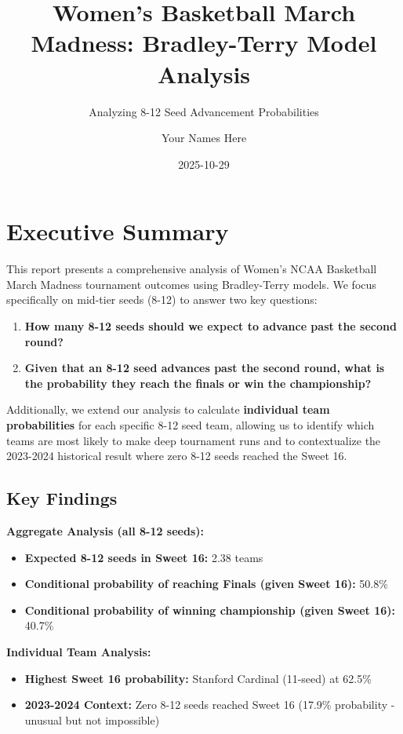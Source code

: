 \documentclass[
]{article}
\title{Women's Basketball March Madness: Bradley-Terry Model Analysis}
\subtitle{Analyzing 8-12 Seed Advancement Probabilities}
\author{Your Names Here}
\date{2025-10-29}
\providecommand{\tightlist}{%
  \setlength{\itemsep}{0pt}\setlength{\parskip}{0pt}}
\begin{document}
\maketitle

{
\setcounter{tocdepth}{3}
\tableofcontents
}
\section{Executive Summary}\label{executive-summary}

This report presents a comprehensive analysis of Women's NCAA Basketball
March Madness tournament outcomes using Bradley-Terry models. We focus
specifically on mid-tier seeds (8-12) to answer two key questions:

\begin{enumerate}
\def\labelenumi{\arabic{enumi}.}
\tightlist
\item
  \textbf{How many 8-12 seeds should we expect to advance past the
  second round?}
\item
  \textbf{Given that an 8-12 seed advances past the second round, what
  is the probability they reach the finals or win the championship?}
\end{enumerate}

Additionally, we extend our analysis to calculate \textbf{individual
team probabilities} for each specific 8-12 seed team, allowing us to
identify which teams are most likely to make deep tournament runs and to
contextualize the 2023-2024 historical result where zero 8-12 seeds
reached the Sweet 16.

\subsection{Key Findings}\label{key-findings}

\textbf{Aggregate Analysis (all 8-12 seeds):}

\begin{itemize}
\tightlist
\item
  \textbf{Expected 8-12 seeds in Sweet 16:} 2.38 teams
\item
  \textbf{Conditional probability of reaching Finals (given Sweet 16):}
  50.8\%
\item
  \textbf{Conditional probability of winning championship (given Sweet
  16):} 40.7\%
\end{itemize}

\textbf{Individual Team Analysis:}

\begin{itemize}
\tightlist
\item
  \textbf{Highest Sweet 16 probability:} Stanford Cardinal (11-seed) at
  62.5\%
\item
  \textbf{2023-2024 Context:} Zero 8-12 seeds reached Sweet 16 (17.9\%
  probability - unusual but not impossible)
\end{itemize}
\end{document}

